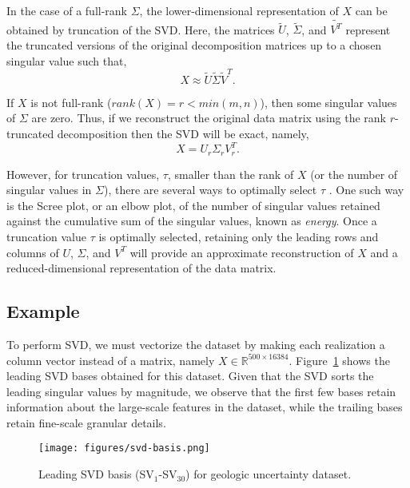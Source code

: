 \documentclass[a4paper,fleqn,12pt]{article}
\begin{document}
In the case of a full-rank $\Sigma$, the lower-dimensional representation of $X$ can be obtained by truncation of the SVD. Here, the matrices $\tilde{U}$, $\tilde{\Sigma}$, and $\tilde{V^T}$ represent the truncated versions of the original decomposition matrices up to a chosen singular value such that,
\begin{equation}
    X \approx \tilde{U}\tilde{\Sigma}\tilde{V}^T .
\end{equation}

If $X$ is not full-rank ($rank(X)=r<min(m,n)$), then some singular values of $\Sigma$ are zero. Thus, if we reconstruct the original data matrix using the rank $r$-truncated decomposition then the SVD will be exact, namely,
\begin{equation}
    X = U_r \Sigma_r V_r^T .
\end{equation}

However, for truncation values, $\tau$, smaller than the rank of $X$ (or the number of singular values in $\Sigma$), there are several ways to optimally select $\tau$ \cite{hansen1990truncated}. One such way is the Scree plot, or an elbow plot, of the number of singular values retained against the cumulative sum of the singular values, known as \emph{energy}. Once a truncation value $\tau$ is optimally selected, retaining only the leading rows and columns of $U$, $\Sigma$, and $V^T$ will provide an approximate reconstruction of $X$ and a reduced-dimensional representation of the data matrix.

\subsection*{Example}
To perform SVD, we must vectorize the dataset by making each realization a column vector instead of a matrix, namely $X\in\mathbb{R}^{500\times16384}$. Figure~\ref{fig:svd-basis} shows the leading SVD bases obtained for this dataset. Given that the SVD sorts the leading singular values by magnitude, we observe that the first few bases retain information about the large-scale features in the dataset, while the trailing bases retain fine-scale granular details. 

\begin{figure}[H]
    \centering
    \texttt{[image: figures/svd-basis.png]}
    \caption{Leading SVD basis (SV$_1$-SV$_{30}$) for geologic uncertainty dataset.}
    \label{fig:svd-basis}
\end{figure}
\end{document}
